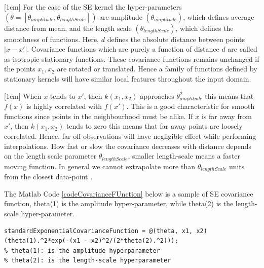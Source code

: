[1cm]
For the case of the SE kernel the hyper-parameters $(\theta = [\theta_{amplitude}, \theta_{lengthScale}])$ are amplitude $(\theta_{amplitude})$, which defines average distance from mean, and the length scale $(\theta_{lengthScale})$, which defines the smoothness of functions. Here, $d$ defines the absolute distance between points $|x-x'|$. Covariance functions which are purely a function of distance $d$ are called as isotropic stationary functions. These covariance functions remains unchanged if the points $x_{1}, x_{2}$ are rotated or translated. Hence a family of functions defined by stationary kernels will have similar local features throughout the input domain. 

[1cm]
When $x$ tends to $x'$, then $k(x_{1}, x_{2})$ approaches $\theta_{amplitude}^{2}$ this means that $f(x)$ is highly correlated with $f(x')$. This is a good characteristic for smooth functions since points in the neighbourhood must be alike. If $x$ is far away from  $x'$, then $k(x_{1}, x_{2})$ tends to zero this means that far away points are loosely correlated. Hence, far off observations will have negligible effect while performing interpolations. How fast or slow the covariance decreases with distance depends on the length scale parameter $\theta_{lengthScale}$, smaller length-scale means a faster moving function. In general we cannot extrapolate more than $\theta_{lengthScale}$ units from the closest data-point \cite{duvenaud-thesis-2014}. 

The Matlab Code \ref{codeCovarianceFUnction} below is a sample of SE covariance function, theta(1) is the amplitude hyper-parameter, while theta(2) is the length-scale hyper-parameter.
\begin{mdframed}[hidealllines=true,backgroundcolor=lightgray!20]
\begin{lstlisting}[caption={A SE covariance function}, 
                    captionpos=b, 
                    label={codeCovarianceFUnction},
                    style=Matlab-editor, 
                    basicstyle=\color{black}\ttfamily\small,
                    backgroundcolor = \color{MatlabCellColour}]
% Standard exponential covariance function
standardExponentialCovarianceFunction = @(theta, x1, x2)(theta(1).^2*exp(-(x1 - x2)^2/(2*theta(2).^2))); 
% theta(1): is the amplitude hyperparameter
% theta(2): is the length-scale hyperparameter
\end{lstlisting}
\end{mdframed}

